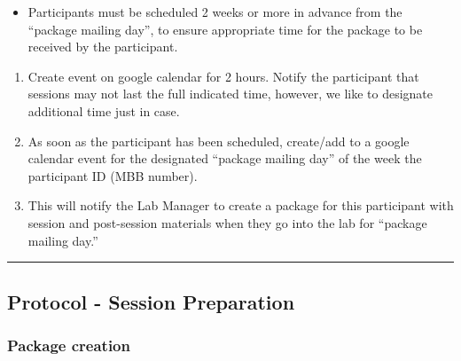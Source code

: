 \documentclass[]{book}
\providecommand{\tightlist}{%
  \setlength{\itemsep}{0pt}\setlength{\parskip}{0pt}}
\begin{document}
\begin{itemize}
\tightlist
\item
  Participants must be scheduled 2 weeks or more in advance from the ``package mailing day'', to ensure appropriate time for the package to be received by the participant.
\end{itemize}

\begin{enumerate}
\def\labelenumi{\arabic{enumi}.}
\setcounter{enumi}{2}
\tightlist
\item
  Create event on google calendar for 2 hours. Notify the participant that sessions may not last the full indicated time, however, we like to designate additional time just in case.
\item
  As soon as the participant has been scheduled, create/add to a google calendar event for the designated ``package mailing day'' of the week the participant ID (MBB number).
\item
  This will notify the Lab Manager to create a package for this participant with session and post-session materials when they go into the lab for ``package mailing day.''
\end{enumerate}

\begin{center}\rule{0.5\linewidth}{0.5pt}\end{center}

\hypertarget{protocol---session-preparation-2}{%
\subsection{Protocol - Session Preparation}\label{protocol---session-preparation-2}}

\hypertarget{package-creation-2}{%
\subsubsection{Package creation}\label{package-creation-2}}
\end{document}
